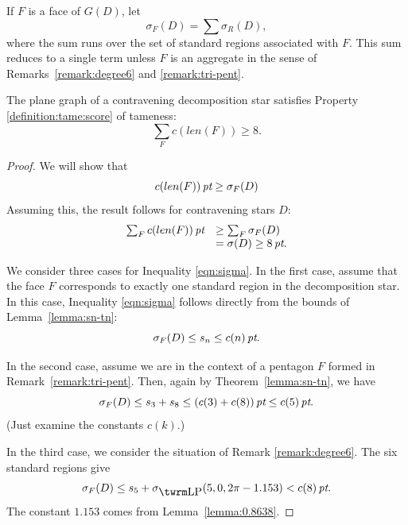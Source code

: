
If $F$ is a face of $G(D)$, let
    $$\sigma_F(D) = \sum \sigma_R(D),$$
where the sum runs over the set of standard regions associated
with $F$.  This sum reduces to a single term unless $F$ is an
aggregate in the sense of Remarks~\ref{remark:degree6} and
\ref{remark:tri-pent}.


\begin{lemma}
    The plane graph of a contravening decomposition star satisfies
    Property \ref{definition:tame:score} of tameness:
    $$\sum_F c(len(F)) \ge 8.$$
\end{lemma}

\begin{proof}
We will show that
    \begin{equation}
    c(len(F))\,\hbox{\it pt} \ge \sigma_F(D)
    \label{eqn:sigma}
    \end{equation}
    Assuming this, the result follows for contravening
    stars $D$:
    $$
    \begin{array}{lll}
        \sum_F c(len(F)) \,\hbox{\it pt} &\ge \sum_F \sigma_F(D) \\
            &= \sigma(D) \ge 8\,\hbox{\it pt}.
    \end{array}
    $$

We consider three cases for Inequality \ref{eqn:sigma}. In the
first case, assume that the face $F$ corresponds to exactly one
standard region in the decomposition star.  In this case,
Inequality \ref{eqn:sigma} follows directly from the bounds of
Lemma~\ref{lemma:sn-tn}:
    $$\sigma_F(D)\le s_n \le c(n)\,\hbox{\it pt}.$$

In the second case, assume we are in the context of a pentagon $F$
formed in Remark~\ref{remark:tri-pent}.  Then, again by
Theorem~\ref{lemma:sn-tn}, we have
$$\sigma_F(D) \le s_3+s_8\le (c(3)+c(8))\,\hbox{\it pt} \le c(5)\,\hbox{\it pt}.$$
(Just examine the constants $c(k)$.)

In the third case, we consider the situation of Remark
\ref{remark:degree6}.  The six standard regions give
$$\sigma_F(D)\le s_5+\sLP(5,0,2\pi-1.153)< c(8)\,\pt.$$
The constant $1.153$ comes from Lemma~\ref{lemma:0.8638}.
\end{proof}


